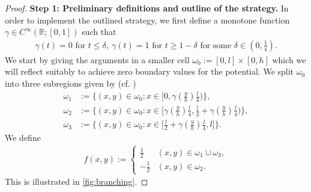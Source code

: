 \documentclass[a4paper, 10pt, twoside, notitlepage]{amsart}
\theoremstyle{plain}
\newcommand{\R}{\mathbb{R}}
\begin{document}
\begin{proof}
                      \textbf{Step 1: Preliminary definitions and outline of the strategy.}
			In order to implement the outlined strategy, we first define a monotone function $\gamma \in C^{\infty}(\R;[0,1])$ such that 
			\begin{align*}
				\gamma(t) = 0 \text{ for } t \leq \delta, \ \gamma(t) = 1 \text{ for } t \geq 1-\delta \mbox{ for some } \delta \in (0,\frac{1}{4}).
			\end{align*}
                        We start by giving the arguments in a smaller cell $\omega_0 := [0,l] \times [0,h]$ which we will reflect suitably to achieve zero boundary values for the potential.
			We split $\omega_0$ into three subregions given by (cf. \cite{CC15})
			\begin{align*}
				\omega_1 & := \Big\{(x,y) \in \omega_0 : x \in \big[0 , \gamma(\frac{y}{h})\frac{l}{4}\big)\Big\},\\
				\omega_2 & := \Big\{(x,y) \in \omega_0 : x \in \big[ \gamma(\frac{y}{h}) \frac{l}{4}, \frac{l}{2}+\gamma(\frac{y}{h}) \frac{l}{4} \big) \Big\},\\
				\omega_3 & := \Big\{(x,y) \in \omega_0 : x \in \big[ \frac{l}{2}+\gamma(\frac{y}{h}) \frac{l}{4}, l \big]\Big\}.
			\end{align*}
			We define
			\begin{align*}
				f(x,y) := \begin{cases}\frac{1}{2} & (x,y) \in \omega_1 \cup \omega_3, \\ -\frac{1}{2} & (x,y) \in \omega_2. \end{cases}
			\end{align*}
                        This is illustrated in \cref{fig:branching}.
                        

\end{proof}
\end{document}
